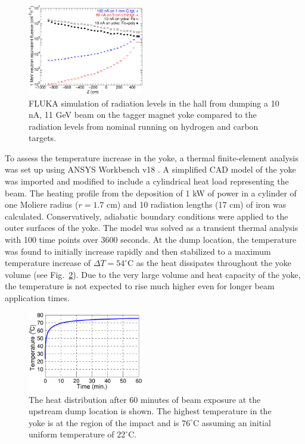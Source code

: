 \begin{figure}[hbt]
\begin{center}
\includegraphics[width=0.45\textwidth]{Radiation.pdf}
	\caption{FLUKA simulation of radiation levels in the hall from dumping a 10 nA, 11 GeV beam on the tagger magnet yoke compared to 
	the radiation levels from nominal running on hydrogen and carbon targets. }
\label{fig:raddem}
\end{center}
\end{figure}

To assess the temperature increase in the yoke, a thermal finite-element analysis was set up using ANSYS Workbench v18 \cite{ANSYS}. 
A simplified CAD model of the yoke was imported and modified to include a cylindrical heat load representing the beam. The heating 
profile from the deposition of 1 kW of power in a cylinder of one Moliere radius ($r = 1.7$ cm) and 10 radiation lengths (17 cm) of iron 
was calculated. Conservatively, adiabatic boundary conditions were applied to the outer surfaces of the yoke. The model was solved as 
a transient thermal analysis with 100 time points over 3600 seconds. At the dump location, the temperature was found to initially increase
rapidly and then stabilized to a maximum temperature increase of $\Delta T = 54^\circ$C as the heat dissipates throughout the yoke 
volume (see Fig.~\ref{fig:ansys_yoke}). Due to the very large volume and heat capacity of the yoke, the temperature is not expected to 
rise much higher even for longer beam application times.

\begin{figure}[hbt]
\begin{center}
\includegraphics[width=0.45\textwidth]{YokeHeating.pdf}
	\caption{The heat distribution after $60$ minutes of beam exposure at the upstream dump location is shown. The highest 
	temperature in the yoke is at the region of the impact and is $76^\circ$C assuming an initial uniform temperature of $22^\circ$C.}
\label{fig:ansys_yoke}
\end{center}
\end{figure}





